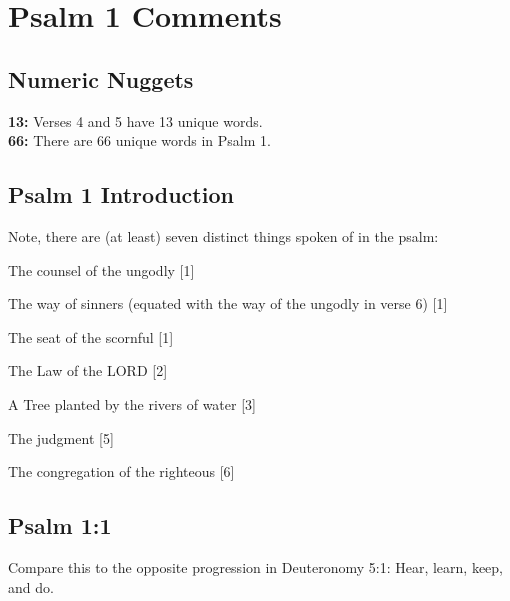 \section{Psalm 1 Comments}

\subsection{Numeric Nuggets}
\textbf{13:} Verses 4 and 5 have 13 unique words.\\
\noindent \textbf{66:} There are 66 unique words in Psalm 1.

\subsection{Psalm 1 Introduction}
Note, there are (at least) seven distinct things spoken of in the psalm:
\begin{compactenum}
    \item The counsel of the ungodly [1]
    \item The way of sinners (equated with the way of the ungodly in verse 6) [1]
    \item The seat of the scornful [1]
    \item The Law of the LORD [2]
    \item A Tree planted by the rivers of water [3]
    \item The judgment [5]
    \item The congregation of the righteous [6]
\end{compactenum}


\subsection{Psalm 1:1}
Compare this to the opposite progression in Deuteronomy 5:1: Hear, learn, keep, and do.